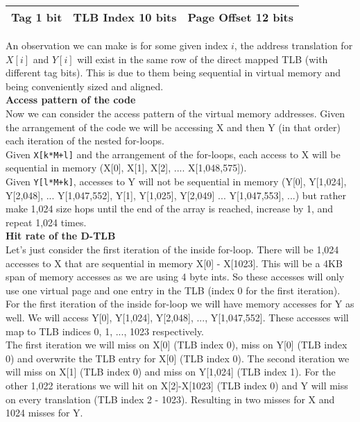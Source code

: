 \documentclass[a4paper, 11pt]{exam}
\begin{document}
\begin{enumerate}
\begin{center}
	\begin{tabular}{|c|c|c|}
		\hline
		Tag 1 bit & TLB Index 10 bits & Page Offset 12 bits\\
		\hline
	\end{tabular}
\end{center}

An observation we can make is for some given index $i$, the address translation for $X[i]$ and $Y[i]$ will exist in the same row of the direct mapped TLB (with different tag bits). This is due to them being sequential in virtual memory and being conveniently sized and aligned. \\

\textbf{Access pattern of the code} \\

Now we can consider the access pattern of the virtual memory addresses. Given the arrangement of the code we will be accessing X and then Y (in that order) each iteration of the nested for-loops. \\

Given \texttt{X[k*M+l]} and the arrangement of the for-loops, each access to X will be sequential in memory (X[0], X[1], X[2], .... X[1,048,575]). \\

Given \texttt{Y[l*M+k]}, accesses to Y will not be sequential in memory (Y[0], Y[1,024], Y[2,048], ... Y[1,047,552], Y[1], Y[1,025], Y[2,049] ... Y[1,047,553], ...) but rather make 1,024 size hops until the end of the array is reached, increase by 1, and repeat 1,024 times. \\

\textbf{Hit rate of the D-TLB} \\

Let's just consider the first iteration of the inside for-loop. There will be 1,024 accesses to X that are sequential in memory X[0] - X[1023]. This will be a 4KB span of memory accesses as we are using 4 byte ints. So these accesses will only use one virtual page and one entry in the TLB (index 0 for the first iteration). \\

For the first iteration of the inside for-loop we will have memory accesses for Y as well. We will access Y[0], Y[1,024], Y[2,048], ..., Y[1,047,552]. These accesses will map to TLB indices 0, 1, ..., 1023 respectively.\\

The first iteration we will miss on X[0] (TLB index 0), miss on Y[0] (TLB index 0) and overwrite the TLB entry for X[0] (TLB index 0). The second iteration we will miss on X[1] (TLB index 0) and miss on Y[1,024] (TLB index 1). For the other 1,022 iterations we will hit on X[2]-X[1023] (TLB index 0) and Y will miss on every translation (TLB index 2 - 1023). Resulting in two misses for X and 1024 misses for Y. \\


\end{enumerate}
\end{document}
